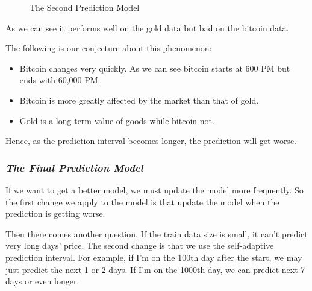 \documentclass[12pt]{article}
\begin{document}
    \begin{figure}[H]
        \centering
        \caption{The Second Prediction Model}
        \label{fig:2nd model}
    \end{figure}

    As we can see it performs well on the gold data but bad on the bitcoin data.

    The following is our conjecture about this phenomenon:
    \begin{itemize}
        \item Bitcoin changes very quickly.
        As we can see bitcoin starts at 600 PM but ends with 60,000 PM.
        \item Bitcoin is more greatly affected by the market than that of gold.
        \item Gold is a long-term value of goods while bitcoin not.
    \end{itemize}

    Hence, as the prediction interval becomes longer, the prediction will get worse.

    \subsubsection{\textit{The Final Prediction Model}}

    If we want to get a better model, we must update the model more frequently.
    So the first change we apply to the model is that update the model when the prediction is getting worse.

    Then there comes another question.
    If the train data size is small, it can't predict very long days' price.
    The second change is that we use the self-adaptive prediction interval.
    For example, if I'm on the 100th day after the start, we may just predict the next 1 or 2 days.
    If I'm on the 1000th day, we can predict next 7 days or even longer.
    
\end{document}
